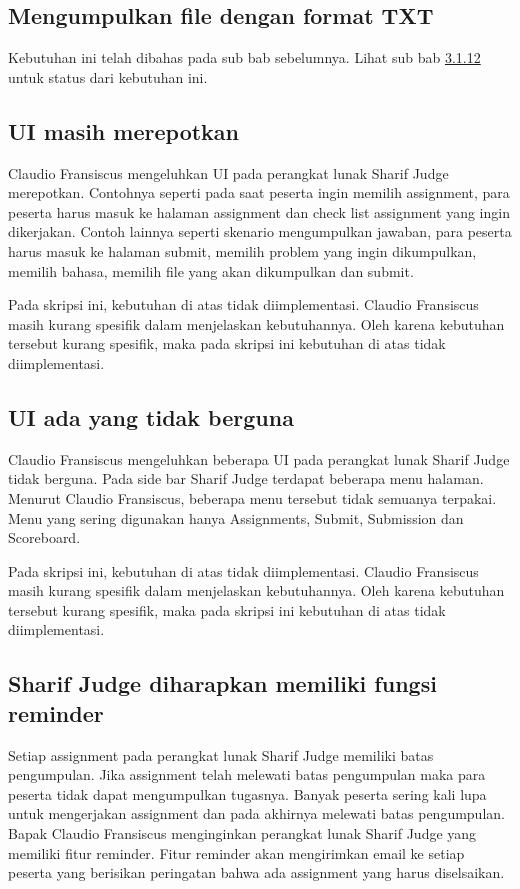 \subsection{Mengumpulkan file dengan format TXT}
Kebutuhan ini telah dibahas pada sub bab sebelumnya. Lihat sub bab \hyperref[subsec:filetxt]{3.1.12} untuk status dari kebutuhan ini.

\subsection{UI masih merepotkan}
Claudio Fransiscus mengeluhkan UI pada perangkat lunak Sharif Judge merepotkan. Contohnya seperti pada saat peserta ingin memilih assignment, para peserta harus masuk ke halaman assignment dan check list assignment yang ingin dikerjakan. Contoh lainnya seperti skenario mengumpulkan jawaban, para peserta harus masuk ke halaman submit, memilih problem yang ingin dikumpulkan, memilih bahasa, memilih file yang akan dikumpulkan dan submit.

Pada skripsi ini, kebutuhan di atas tidak diimplementasi. Claudio Fransiscus masih kurang spesifik dalam menjelaskan kebutuhannya. Oleh karena kebutuhan tersebut kurang spesifik, maka pada skripsi ini kebutuhan di atas tidak diimplementasi.

\subsection{UI ada yang tidak berguna}
Claudio Fransiscus mengeluhkan beberapa UI pada perangkat lunak Sharif Judge tidak berguna. Pada side bar Sharif Judge terdapat beberapa menu halaman. Menurut Claudio Fransiscus, beberapa menu tersebut tidak semuanya terpakai. Menu yang sering digunakan hanya Assignments, Submit, Submission dan Scoreboard.

Pada skripsi ini, kebutuhan di atas tidak diimplementasi. Claudio Fransiscus masih kurang spesifik dalam menjelaskan kebutuhannya. Oleh karena kebutuhan tersebut kurang spesifik, maka pada skripsi ini kebutuhan di atas tidak diimplementasi.

\subsection{Sharif Judge diharapkan memiliki fungsi reminder}
Setiap assignment pada perangkat lunak Sharif Judge memiliki batas pengumpulan. Jika assignment telah melewati batas pengumpulan maka para peserta tidak dapat mengumpulkan tugasnya. Banyak peserta sering kali lupa untuk mengerjakan assignment dan pada akhirnya melewati batas pengumpulan. Bapak Claudio Fransiscus menginginkan perangkat lunak Sharif Judge yang memiliki fitur reminder. Fitur reminder akan mengirimkan email ke setiap peserta yang berisikan peringatan bahwa ada assignment yang harus diselsaikan. 

